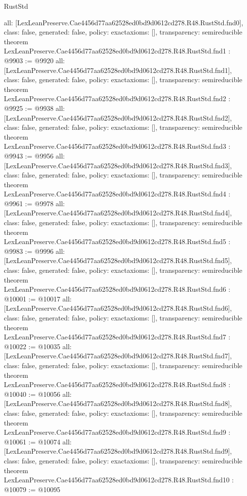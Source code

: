 \begin{lexlean}{RustStd}
\begin{coremodule}
{  all: [LexLeanPreserve.Cae4456d77aa62528ed0bd9d0612cd278.R48.RustStd.fnd0],
  class: false,
  generated: false,
  policy: exact{axioms: []},
  transparency: semireducible
}
theorem LexLeanPreserve.Cae4456d77aa62528ed0bd9d0612cd278.R48.RustStd.fnd1 : @9903 := @9920 {
  all: [LexLeanPreserve.Cae4456d77aa62528ed0bd9d0612cd278.R48.RustStd.fnd1],
  class: false,
  generated: false,
  policy: exact{axioms: []},
  transparency: semireducible
}
theorem LexLeanPreserve.Cae4456d77aa62528ed0bd9d0612cd278.R48.RustStd.fnd2 : @9925 := @9938 {
  all: [LexLeanPreserve.Cae4456d77aa62528ed0bd9d0612cd278.R48.RustStd.fnd2],
  class: false,
  generated: false,
  policy: exact{axioms: []},
  transparency: semireducible
}
theorem LexLeanPreserve.Cae4456d77aa62528ed0bd9d0612cd278.R48.RustStd.fnd3 : @9943 := @9956 {
  all: [LexLeanPreserve.Cae4456d77aa62528ed0bd9d0612cd278.R48.RustStd.fnd3],
  class: false,
  generated: false,
  policy: exact{axioms: []},
  transparency: semireducible
}
theorem LexLeanPreserve.Cae4456d77aa62528ed0bd9d0612cd278.R48.RustStd.fnd4 : @9961 := @9978 {
  all: [LexLeanPreserve.Cae4456d77aa62528ed0bd9d0612cd278.R48.RustStd.fnd4],
  class: false,
  generated: false,
  policy: exact{axioms: []},
  transparency: semireducible
}
theorem LexLeanPreserve.Cae4456d77aa62528ed0bd9d0612cd278.R48.RustStd.fnd5 : @9983 := @9996 {
  all: [LexLeanPreserve.Cae4456d77aa62528ed0bd9d0612cd278.R48.RustStd.fnd5],
  class: false,
  generated: false,
  policy: exact{axioms: []},
  transparency: semireducible
}
theorem LexLeanPreserve.Cae4456d77aa62528ed0bd9d0612cd278.R48.RustStd.fnd6 : @10001 := @10017 {
  all: [LexLeanPreserve.Cae4456d77aa62528ed0bd9d0612cd278.R48.RustStd.fnd6],
  class: false,
  generated: false,
  policy: exact{axioms: []},
  transparency: semireducible
}
theorem LexLeanPreserve.Cae4456d77aa62528ed0bd9d0612cd278.R48.RustStd.fnd7 : @10022 := @10035 {
  all: [LexLeanPreserve.Cae4456d77aa62528ed0bd9d0612cd278.R48.RustStd.fnd7],
  class: false,
  generated: false,
  policy: exact{axioms: []},
  transparency: semireducible
}
theorem LexLeanPreserve.Cae4456d77aa62528ed0bd9d0612cd278.R48.RustStd.fnd8 : @10040 := @10056 {
  all: [LexLeanPreserve.Cae4456d77aa62528ed0bd9d0612cd278.R48.RustStd.fnd8],
  class: false,
  generated: false,
  policy: exact{axioms: []},
  transparency: semireducible
}
theorem LexLeanPreserve.Cae4456d77aa62528ed0bd9d0612cd278.R48.RustStd.fnd9 : @10061 := @10074 {
  all: [LexLeanPreserve.Cae4456d77aa62528ed0bd9d0612cd278.R48.RustStd.fnd9],
  class: false,
  generated: false,
  policy: exact{axioms: []},
  transparency: semireducible
}
theorem LexLeanPreserve.Cae4456d77aa62528ed0bd9d0612cd278.R48.RustStd.fnd10 : @10079 := @10095 {
}
\end{coremodule}
\end{lexlean}
